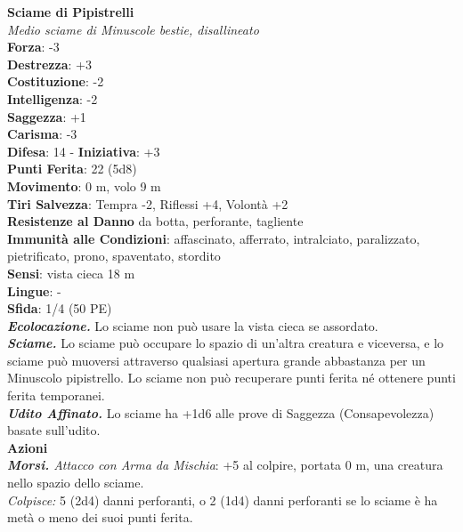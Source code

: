 \begin{multicols}{2}
\medskip\textbf{Sciame di Pipistrelli}\\
\emph{Medio sciame di Minuscole bestie, disallineato}\\
\textbf{Forza}: -3\\
\textbf{Destrezza}: +3\\
\textbf{Costituzione}: -2\\
\textbf{Intelligenza}: -2\\
\textbf{Saggezza}: +1\\
\textbf{Carisma}: -3\\
\textbf{Difesa}: 14 - \textbf{Iniziativa}: +3\\
\textbf{Punti Ferita}: 22 (5d8)\\
\textbf{Movimento}: 0 m, volo 9 m\\
\textbf{Tiri Salvezza}: Tempra -2, Riflessi +4, Volontà +2\\
\textbf{Resistenze al Danno} da botta, perforante, tagliente\\
\textbf{Immunità alle Condizioni}: affascinato, afferrato, intralciato, paralizzato, pietrificato, prono, spaventato, stordito\\
\textbf{Sensi}: vista cieca 18 m\\
\textbf{Lingue}: -\\
\textbf{Sfida}: 1/4 (50 PE)\smallskip\\
\emph{\textbf{Ecolocazione.}} Lo sciame non può usare la vista cieca se assordato.\\
\emph{\textbf{Sciame.}} Lo sciame può occupare lo spazio di un'altra creatura e viceversa, e lo sciame può muoversi attraverso qualsiasi apertura grande abbastanza per un Minuscolo pipistrello. Lo sciame non può recuperare punti ferita né ottenere punti ferita temporanei.\\
\emph{\textbf{Udito Affinato.}} Lo sciame ha +1d6 alle prove di Saggezza (Consapevolezza) basate sull'udito.\\
\smallskip\textbf{Azioni}\\
\emph{\textbf{Morsi.} Attacco con Arma da Mischia}: +5 al colpire, portata 0 m, una creatura nello spazio dello sciame.\\
\emph{Colpisce:} 5 (2d4) danni perforanti, o 2 (1d4) danni perforanti se lo sciame è ha metà o meno dei suoi punti ferita.\\


\end{multicols}
